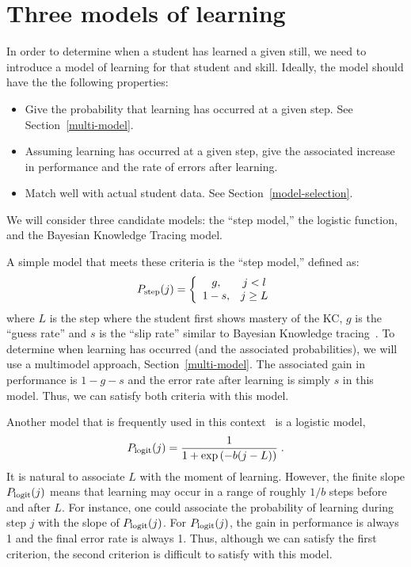 \documentclass[11pt,letterpaper]{article}
\begin{document}
\section{Three models of learning}

In order to determine when a student has learned a given still,
we need to introduce a model of learning for that student and skill.
Ideally, the model should have the the following properties:
\label{model-criteria}
\begin{itemize} 

\item Give the probability that learning has occurred at a given step.
      See Section~\ref{multi-model}.

\item  Assuming learning has occurred at a given step, give the 
     associated increase in performance and 
     the rate of errors after learning.

\item Match well with actual student data.
      See Section~\ref{model-selection}.

\end{itemize}
%
We will consider three candidate models:  the ``step model,'' 
the logistic function, and the Bayesian Knowledge Tracing model.

A simple model that meets these criteria is the ``step model,'' defined
as:
\begin{equation}
    P_{\rm step}(j)= \left\{\begin{array}{cc}
                 g, & j<l \\
                 1-s, & j\ge L 
                 \end{array} \right. 
\end{equation}
where $L$ is the step where the student first shows mastery of the
KC, $g$ is the ``guess rate'' and $s$ is the ``slip rate'' similar
to Bayesian Knowledge tracing~\cite{anderson}.  To determine
when learning has occurred (and the associated probabilities), 
we will use a multimodel approach, 
Section~\ref{multi-model}.  The associated gain in performance
is $1-g-s$ and the error rate after learning is simply $s$ in this
model.  Thus, we can satisfy both criteria with this model.

Another model that is frequently used in this context~\cite{logit} 
is a logistic model,
%
\begin{equation}
    P_{\rm logit}(j)= \frac{1}{1+\exp\left(-b (j-L)\right)} \; .
\end{equation}
%
It is natural to associate $L$ with the moment of learning.  However,
the finite slope $P_{\rm logit}(j)$ means that learning may occur
in a range of roughly $1/b$ steps before and after $L$.  For instance,
one could associate the probability of learning during step $j$ with
the slope of $P_{\rm logit}(j)$.  For  
$P_{\rm logit}(j)$, the gain in performance is always 1 and the final error
rate is always 1.  Thus, although we can satisfy the first
criterion, the second criterion is difficult to satisfy with this model.
\end{document}
